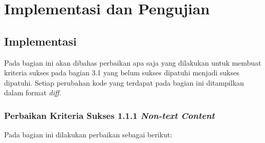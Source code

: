 \chapter{Implementasi dan Pengujian}
\label{chap:implementasi_dan_pengujian}

\section{Implementasi}
\label{sec:implementasi}
Pada bagian ini akan dibahas perbaikan apa saja yang dilakukan untuk membuat kriteria sukses pada bagian 3.1
yang belum sukses dipatuhi menjadi sukses dipatuhi. Setiap perubahan kode yang terdapat pada bagian ini ditampilkan dalam format \textit{diff}.

\subsection{Perbaikan Kriteria Sukses 1.1.1 \textit{Non-text Content}}
\label{subsec:perbaikan_kriteria_sukses_1.1.1}
Pada bagian ini dilakukan perbaikan sebagai berikut:

